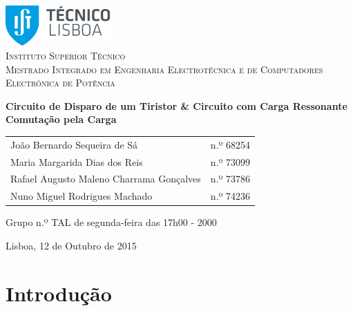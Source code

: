 \documentclass[a4paper,11pt]{article}
\numberwithin{equation}{section}
\begin{document}
\begin{titlepage}
\begin{center}
	
\hfill \break
\hfill \break

\includegraphics[width=0.3\textwidth]{img/logo}~\\[1cm] 

\textsc{\LARGE Instituto Superior Técnico}\\[0.25cm]
\textsc{\Large Mestrado Integrado em Engenharia Electrotécnica e de Computadores}\\[1.8cm]
\textsc{\huge Electrónica de Potência}\\[0.25cm]

\vspace{6mm}

{\huge \bfseries Circuito de Disparo de um Tiristor \linebreak \& \linebreak Circuito com Carga Ressonante \linebreak Comutação pela Carga  \\[1cm]}

\begin{tabular}{ l l }
	João Bernardo Sequeira de Sá & \hspace{2mm} n.º 68254 \\
	Maria Margarida Dias dos Reis & \hspace{2mm} n.º 73099 \\
	Rafael Augusto Maleno Charrama Gonçalves & \hspace{2mm} n.º 73786 \\
	Nuno Miguel Rodrigues Machado & \hspace{2mm} n.º 74236
\end{tabular}

\vspace{7mm}

Grupo n.º TAL de segunda-feira das 17h00 - 2000

\vfill

{\large Lisboa, 12 de Outubro de 2015} 
	
\end{center}
\end{titlepage}
	
\tableofcontents
\pagebreak

\section{Introdução}
\end{document}

